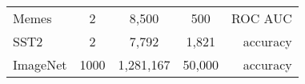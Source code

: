 \begin{table}[t]
{\begin{tabular}{lcccr}
Memes            & 2                              & 8,500                             & 500                            & ROC AUC                                  \\
SST2            & 2                              & 7,792                             & 1,821                            & accuracy                                  \\
ImageNet                        & 1000                            & 1,281,167                          & 50,000                            & accuracy                                  \\
\bottomrule
\end{tabular}}

\vspace{-3mm}
\end{table}